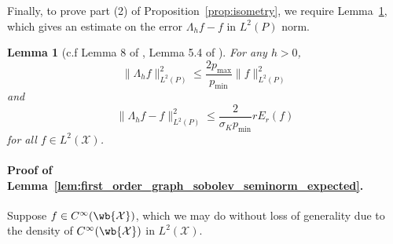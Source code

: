 \documentclass{article}
\newcommand{\1}{\mathbf{1}}
\newcommand{\Xset}{\mathcal{X}}
\newcommand{\Leb}{L}
\theoremstyle{alden}
\theoremstyle{aldenthm}
\newtheorem{lemma}{Lemma}
\theoremstyle{definition}
\theoremstyle{remark}
\begin{document}
Finally, to prove part (2) of Proposition~\ref{prop:isometry}, we require Lemma~\ref{lem:smoothening_error}, which gives an estimate on the error $\Lambda_h f - f$ in $\Leb^2(P)$ norm.
\begin{lemma}[c.f Lemma 8 of \cite{trillos2019}, Lemma 5.4 of \cite{burago2014}]
	\label{lem:smoothening_error}
	For any $h > 0$, 
	\begin{equation}
	\label{eqn:smoothening_error_norm}
	\bigl\|\Lambda_hf\bigr\|_{\Leb^2(P)}^2 \leq \frac{2p_{\max}}{p_{\min}} \bigl\|f\bigr\|_{\Leb^2(P)}^2
	\end{equation}
	and
	\begin{equation}
	\label{eqn:smoothening_error_energy}
	\bigl\|\Lambda_hf - f\bigr\|_{\Leb^2(P)}^2 \leq \frac{2}{\sigma_Kp_{\min}} r E_r(f)
	\end{equation}
	for all $f \in \Leb^2(\Xset)$.
\end{lemma}

\paragraph{Proof of Lemma~\ref{lem:first_order_graph_sobolev_seminorm_expected}.}
Suppose $f \in C^{\infty}(\wb{\Xset})$, which we may do without loss of generality due to the density of $C^{\infty}(\wb{\Xset})$ in  $\Leb^2(\Xset)$.
\end{document}
